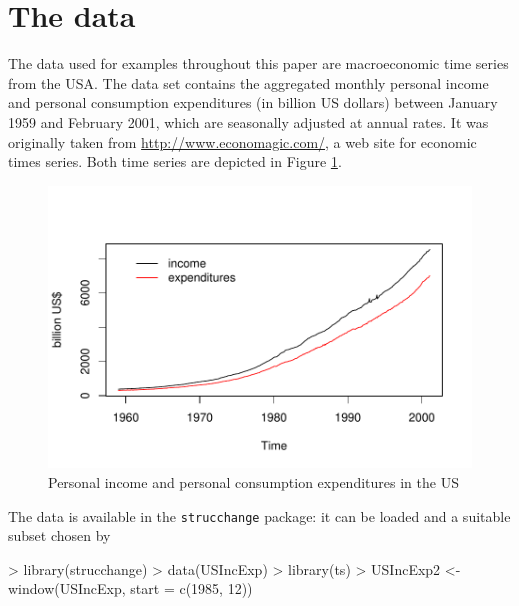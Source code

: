\documentclass[10pt,a4paper]{article}
\begin{document}
\section{The data} \label{sec:data}
The data used for examples throughout this paper are macroeconomic time
series from the USA. The data set contains the aggregated monthly personal
income and
personal consumption expenditures (in billion US dollars) between January 1959
and February 2001, which are seasonally adjusted at annual rates.
It was originally taken from \url{http://www.economagic.com/}, a web site for
economic times series. Both time series are depicted in Figure
\ref{fig:USIncExp}.

\begin{figure}[htbp]
\begin{center}
\includegraphics{strucchange-intro-data}
\caption{\label{fig:USIncExp} Personal income and personal consumption
expenditures in the US}
\end{center}
\end{figure}

The data is
available in the {\tt strucchange} package: it can be loaded and a
suitable subset chosen by
\begin{Schunk}
\begin{Sinput}
> library(strucchange)
> data(USIncExp)
> library(ts)
> USIncExp2 <- window(USIncExp, start = c(1985, 12))
\end{Sinput}
\end{Schunk}
\end{document}
